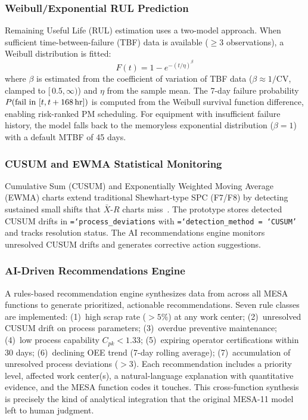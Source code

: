 \documentclass[11pt]{article}
\newcommand{\tfield}[1]{\texttt{\hyphenchar\font=`\-\relax #1}}
\begin{document}
\subsubsection{Weibull/Exponential RUL Prediction}

Remaining Useful Life (RUL) estimation uses a two-model approach.  When sufficient time-between-failure (TBF) data is available ($\geq 3$ observations), a Weibull distribution is fitted:
\[
F(t) = 1 - e^{-(t/\eta)^\beta}
\]
where $\beta$ is estimated from the coefficient of variation of TBF data ($\beta \approx 1/\text{CV}$, clamped to $[\,0.5, \infty)$) and $\eta$ from the sample mean.  The 7-day failure probability $P(\text{fail in } [t, t+168\text{\,hr}])$ is computed from the Weibull survival function difference, enabling risk-ranked PM scheduling.  For equipment with insufficient failure history, the model falls back to the memoryless exponential distribution ($\beta = 1$) with a default MTBF of 45 days.

\subsubsection{CUSUM and EWMA Statistical Monitoring}

Cumulative Sum (CUSUM) and Exponentially Weighted Moving Average (EWMA) charts extend traditional Shewhart-type SPC (F7/F8) by detecting sustained small shifts that $\bar{X}$-$R$ charts miss~\cite{montgomery2019}.  The prototype stores detected CUSUM drifts in \tfield{process\_deviations} with \tfield{detection\_method = `CUSUM'} and tracks resolution status.  The AI recommendations engine monitors unresolved CUSUM drifts and generates corrective action suggestions.

\subsubsection{AI-Driven Recommendations Engine}

A rules-based recommendation engine synthesizes data from across all MESA functions to generate prioritized, actionable recommendations.  Seven rule classes are implemented: (1)~high scrap rate ($>5\%$) at any work center; (2)~unresolved CUSUM drift on process parameters; (3)~overdue preventive maintenance; (4)~low process capability $C_{pk} < 1.33$; (5)~expiring operator certifications within 30 days; (6)~declining OEE trend (7-day rolling average); (7)~accumulation of unresolved process deviations ($>3$).  Each recommendation includes a priority level, affected work center(s), a natural-language explanation with quantitative evidence, and the MESA function codes it touches.  This cross-function synthesis is precisely the kind of analytical integration that the original MESA-11 model left to human judgment.
\end{document}
